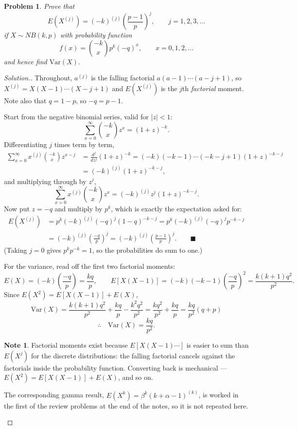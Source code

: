 \documentclass[12pt,a4paper]{report}
\theoremstyle{definition}
\newtheorem{note}[thm]{Note}
\theoremstyle{plain}
\newtheorem{problemx}{Problem}[section]
\newenvironment{problem}{\begin{problemx}}{\end{problemx}}
\newenvironment{solution}
  {\renewcommand{\qedsymbol}{}\begin{proof}[\textit{Solution}.]}
  {\end{proof}}
\begin{document}
\begin{problem}
Prove that
\[E\left(X^{(j)}\right)=(-k)^{(j)}\left(\frac{p-1}{p}\right)^j,\qquad j=1,2,3,\ldots\]
if $X\sim NB(k,p)$ with probability function
\[f(x)=\binom{-k}{x}p^k(-q)^x,\qquad x=0,1,2,\ldots\]
and hence find $\text{Var}(X)$.
\end{problem}

\begin{solution}
Throughout, $a^{(j)}$ is the falling factorial $a(a-1)\cdots(a-j+1)$, so
$X^{(j)}=X(X-1)\cdots(X-j+1)$ and $E\left(X^{(j)}\right)$ is the $j$th
\emph{factorial} moment. Note also that $q=1-p$, so $-q=p-1$.

Start from the negative binomial series, valid for $|z|<1$:
\[\sum_{x=0}^\infty\binom{-k}{x}z^x=(1+z)^{-k}.\]
Differentiating $j$ times term by term,
\begin{align*}
\sum_{x=0}^\infty x^{(j)}\binom{-k}{x}z^{x-j}
&=\frac{d^j}{dz^j}(1+z)^{-k}
=(-k)(-k-1)\cdots(-k-j+1)(1+z)^{-k-j}\\
&=(-k)^{(j)}(1+z)^{-k-j},
\end{align*}
and multiplying through by $z^j$,
\[\sum_{x=0}^\infty x^{(j)}\binom{-k}{x}z^x=(-k)^{(j)}z^j(1+z)^{-k-j}.\]
Now put $z=-q$ and multiply by $p^k$, which is exactly the expectation asked for:
\begin{align*}
E\left(X^{(j)}\right)&=p^k(-k)^{(j)}(-q)^j(1-q)^{-k-j}
=p^k(-k)^{(j)}(-q)^jp^{-k-j}\\
&=(-k)^{(j)}\left(\frac{-q}{p}\right)^j
=(-k)^{(j)}\left(\frac{p-1}{p}\right)^j.\qquad\blacksquare
\end{align*}
(Taking $j=0$ gives $p^kp^{-k}=1$, so the probabilities do sum to one.)

For the variance, read off the first two factorial moments:
\[E(X)=(-k)\left(\frac{-q}{p}\right)=\frac{kq}{p},\qquad
E\left[X(X-1)\right]=(-k)(-k-1)\left(\frac{-q}{p}\right)^2
=\frac{k(k+1)q^2}{p^2}.\]
Since $E\left(X^2\right)=E\left[X(X-1)\right]+E(X)$,
\[\text{Var}(X)=\frac{k(k+1)q^2}{p^2}+\frac{kq}{p}-\frac{k^2q^2}{p^2}
=\frac{kq^2}{p^2}+\frac{kq}{p}
=\frac{kq}{p^2}\left(q+p\right)
\]
\[\therefore\quad\text{Var}(X)=\frac{kq}{p^2}.\]

\begin{note}
Factorial moments exist because $E\left[X(X-1)\cdots\right]$ is easier to sum than
$E\left(X^j\right)$ for the discrete distributions: the falling factorial cancels
against the factorials inside the probability function. Converting back is
mechanical --- $E\left(X^2\right)=E\left[X(X-1)\right]+E(X)$, and so on.

The corresponding gamma result, $E\left(X^k\right)=\beta^k(k+\alpha-1)^{(k)}$,
is worked in the first of the review problems at the end of the notes, so it is
not repeated here.
\end{note}
\end{solution}
\end{document}
